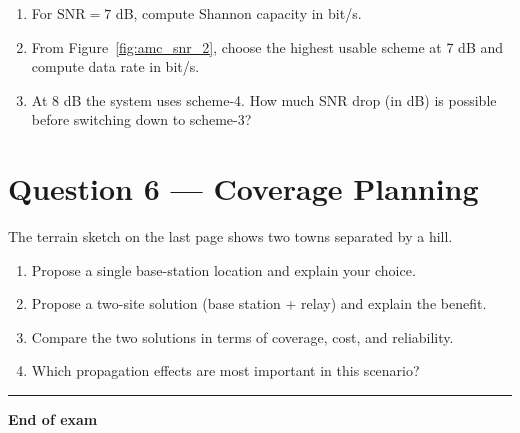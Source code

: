\documentclass[11pt,a4paper]{article}
\begin{document}
\begin{enumerate}[label=\alph*)]
    \item For $\mathrm{SNR}=7$ dB, compute Shannon capacity in bit/s.
    \item From Figure~\ref{fig:amc_snr_2}, choose the highest usable scheme at 7 dB and compute data rate in bit/s.
    \item At 8 dB the system uses scheme-4. How much SNR drop (in dB) is possible before switching down to scheme-3?
\end{enumerate}

\section*{Question 6 --- Coverage Planning}
The terrain sketch on the last page shows two towns separated by a hill.

\begin{enumerate}[label=\alph*)]
    \item Propose a single base-station location and explain your choice.
    \item Propose a two-site solution (base station + relay) and explain the benefit.
    \item Compare the two solutions in terms of coverage, cost, and reliability.
    \item Which propagation effects are most important in this scenario?
\end{enumerate}

\vspace{0.6cm}
\hrule
\vspace{0.3cm}
\textbf{End of exam}


\clearpage
\label{LastPage}
\end{document}
